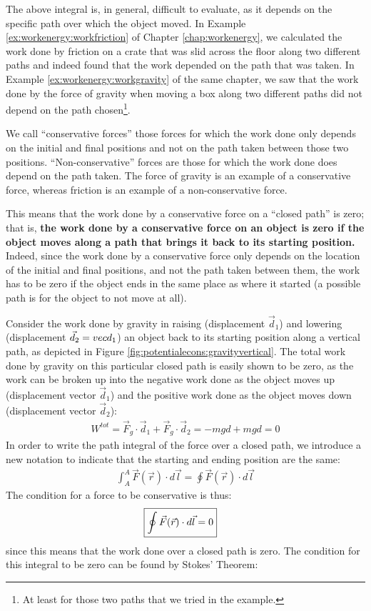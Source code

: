 The above integral is, in general, difficult to evaluate, as it depends on the specific path over which the object moved. In Example \ref{ex:workenergy:workfriction} of Chapter \ref{chap:workenergy}, we calculated the work done by friction on a crate that was slid across the floor along two different paths and indeed found that the work depended on the path that was taken. In Example \ref{ex:workenergy:workgravity} of the same chapter, we saw that the work done by the force of gravity when moving a box along two different paths did not depend on the path chosen\footnote{At least for those two paths that we tried in the example.}.

We call ``conservative forces'' those forces for which the work done only depends on the initial and final positions and not on the path taken between those two positions. ``Non-conservative'' forces are those for which the work done does depend on the path taken. The force of gravity is an example of a conservative force, whereas friction is an example of a non-conservative force.

This means that the work done by a conservative force on a ``closed path'' is zero; that is, \textbf{the work done by a conservative force on an object is zero if the object moves along a path that brings it back to its starting position.}
Indeed, since the work done by a conservative force only depends on the location of the initial and final positions, and not the path taken between them, the work has to be zero if the object ends in the same place as where it started (a possible path is for the object to not move at all).

Consider the work done by gravity in raising (displacement $\vec d_1$) and lowering (displacement $\vec d_2=\-vec d_1$) an object back to its starting position along a vertical path, as depicted in Figure \ref{fig:potentialecons:gravityvertical}.
The total work done by gravity on this particular closed path is easily shown to be zero, as the work can be broken up into the negative work done as the object moves up (displacement vector $\vec d_1$) and the positive work done as the object moves down (displacement vector $\vec d_2$):
\begin{align*}
W^{tot} = \vec F_g \cdot \vec d_1 + \vec F_g \cdot \vec d_2 = -mgd + mgd = 0 
\end{align*}
In order to write the path integral of the force over a closed path, we introduce a new notation to indicate that the starting and ending position are the same:
\begin{align*}
\int_A^A \vec F(\vec r) \cdot d\vec l = \oint \vec F(\vec r) \cdot d\vec l
\end{align*}
The condition for a force to be conservative is thus:
\begin{align}
\Aboxed{\oint \vec F(\vec r) \cdot d\vec l = 0}
\end{align}
since this means that the work done over a closed path is zero. The condition for this integral to be zero can be found by Stokes' Theorem:

